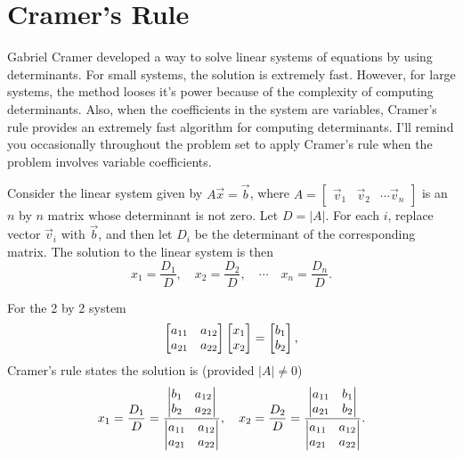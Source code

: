 \section{Cramer's Rule}
Gabriel Cramer developed a way to solve linear systems of equations by using determinants. For small systems, the solution is extremely fast.  However, for large systems, the method looses it's power because of the complexity of computing determinants.  Also, when the coefficients in the system are variables, Cramer's rule provides an extremely fast algorithm for computing determinants. I'll remind you occasionally throughout the problem set to apply Cramer's rule when the problem involves variable coefficients.
\begin{theorem}\label{Cramer's Rule}
 Consider the linear system given by $A\vec x = \vec b$, where 
$A=\begin{bmatrix}\vec v_1 &\vec v_2 &\cdots \vec v_n \end{bmatrix}$
is an $n$ by $n$ matrix whose determinant is not zero.  Let $D=|A|$. For each $i$, replace vector $\vec v_i$ with $\vec b$, and then let $D_i$ be the determinant of the corresponding matrix. The solution to the linear system is then 
$$x_1 = \frac{D_1}{D},\quad x_2 = \frac{D_2}{D},\quad \cdots \quad x_n = \frac{D_n}{D}.$$

For the 2 by 2 system
$$
\begin{bmatrix}\begin{matrix} a_{11}\\a_{21} \end{matrix}&\begin{matrix} a_{12}\\a_{22} \end{matrix} \end{bmatrix}
\begin{bmatrix}\begin{matrix} x_{1}\\x_{2} \end{matrix} \end{bmatrix}
=
\begin{bmatrix}\begin{matrix} b_{1}\\b_{2} \end{matrix} \end{bmatrix},
$$
Cramer's rule states the solution is (provided $|A|\neq 0$) 
$$
x_1 = \frac{D_1}{D}=\frac{\begin{vmatrix}\begin{matrix} b_1\\b_2 \end{matrix}&\begin{matrix} a_{12}\\a_{22} \end{matrix} \end{vmatrix}}{\begin{vmatrix}\begin{matrix} a_{11}\\a_{21} \end{matrix}&\begin{matrix} a_{12}\\a_{22} \end{matrix} \end{vmatrix}},
\quad 
x_2 = \frac{D_2}{D}=\frac{\begin{vmatrix}\begin{matrix} a_{11}\\a_{21} \end{matrix}&\begin{matrix} b_1\\b_2 \end{matrix}\end{vmatrix}}{\begin{vmatrix}\begin{matrix} a_{11}\\a_{21} \end{matrix}&\begin{matrix} a_{12}\\a_{22} \end{matrix} \end{vmatrix}}
.$$
\end{theorem}


